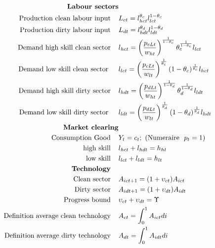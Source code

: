 \begin{align*}
\text{\textbf{Labour sectors}}\\
\text{Production clean labour input} \hspace{4mm}& L_{ct}=l_{hct}^{\theta_c}l_{lct}^{1-\theta_c}\\ 
\text{Production dirty labour input} \hspace{4mm}& L_{dt}=l_{hdt}^{\theta_d}l_{ldt}^{1-\theta_d}\\
%
\text{Demand high skill clean sector}\hspace{4mm}&l_{hct}= \left(\frac{p_{cLt}}{w_{ht}}\right)^{\frac{1}{1-\theta_c}}\theta_c^{\frac{1}{1-\theta_c}}l_{lct}\\
%
\text{Demand low skill clean sector } \hspace{4mm}&l_{lct}= \left(\frac{p_{cLt}}{w_{lt}}\right)^{\frac{1}{\theta_c}}(1-\theta_c)^{\frac{1}{\theta_c}}l_{hct}\\
%
\text{Demand high skill dirty sector} \hspace{4mm}&l_{hdt}= \left(\frac{p_{dLt}}{w_{ht}}\right)^{\frac{1}{1-\theta_d}}\theta_d^{\frac{1}{1-\theta_d}}l_{ldt}\\
%
\text{Demand low skill dirty sector } \hspace{4mm}&l_{ldt}= \left(\frac{p_{dLt}}{w_{lt}}\right)^{\frac{1}{\theta_d}}(1-\theta_d)^{\frac{1}{\theta_d}}l_{hdt}\\
\text{\textbf{Market clearing}}& \nonumber\\
\text{Consumption Good}\hspace{4mm}& Y_{t}=c_t; \ 
(\text{Numeraire}\ \  p_t=1)\\
\text{high skill}\hspace{4mm}& l_{hct}+l_{hdt}=h_{ht}\\
\text{low skill}\hspace{4mm}&l_{lct}+l_{ldt}=h_{lt}\\
\text{\textbf{Technology}}\hspace{4mm}\\
\text{Clean sector}\hspace{4mm}& A_{ict+1}=(1+\upsilon_{ct})A_{ict}\\
\text{Dirty sector}\hspace{4mm}& A_{idt+1}=(1+\upsilon_{dt})A_{idt}\\
\text{Progress bound}\hspace{4mm}& \upsilon_{ct}+\upsilon_{dt}=\Upsilon\\
\text{Definition average clean technology}\hspace{4mm}& A_{ct}=\int_0^1A_{ict}di\\
\text{Definition average dirty technology}\hspace{4mm}& A_{dt}=\int_0^1A_{idt}di
\end{align*}
